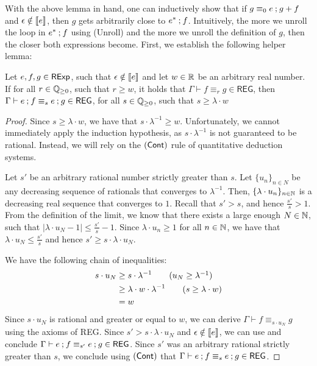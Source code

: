 With the above lemma in hand, one can inductively show that if $g \equiv_0 e \mathbin{;} g + f$ and $\epsilon \notin \left\llbracket{e}\right\rrbracket$, then $g$ gets arbitrarily close to $e^\ast \mathbin{;} f$. Intuitively, the more we unroll the loop in $e^\ast \mathbin{;} f$ using \textsf{(Unroll)} and the more we unroll the definition of $g$, then the closer both expressions become. First, we establish the following helper lemma:
\begin{lemma}\label{c2:lem:real_approximation}
	Let $e,f,g \in \mathsf{RExp}$, such that $\epsilon \notin \left\llbracket{e}\right\rrbracket$ and let $w \in \mathbb{R}$ be an arbitrary real number. If for all $r \in \mathbb{Q}_{\geq 0}$, such that $r \geq w$, it holds that $\Gamma \vdash f \equiv_{r} g \in \mathsf{REG}$, then $\Gamma \vdash e \mathbin{;} f \equiv_{s} e \mathbin{;} g \in \mathsf{REG}$, for all $s \in \mathbb{Q}_{\geq 0}$, such that $s \geq \lambda \cdot w$
\end{lemma}
\begin{proof}
	Since $s \geq \lambda \cdot w$, we have that $s \cdot \lambda^{-1} \geq w$. Unfortunately, we cannot immediately apply the induction hypothesis, as $s \cdot \lambda^{-1}$ is not guaranteed to be rational. Instead, we will rely on the $(\textsf{Cont})$ rule of quantitative deduction systems. 
	
		Let $s'$ be an arbitrary rational number strictly greater than $s$. Let $\{u_n\}_{n \in N}$ be any decreasing sequence of rationals that converges to $\lambda^{-1}$. Then, $\{\lambda \cdot u_n\}_{n \in \mathbb{N}}$ is a decreasing real sequence that converges to $1$. Recall that $s' > s$, and hence $\frac{s'}{s} >1$. From the definition of the limit, we know that there exists a large enough $N \in \mathbb{N}$, such that $|\lambda \cdot u_N - 1 | \leq \frac{s'}{s}-1$. Since $\lambda \cdot u_n \geq 1$ for all $n \in \mathbb{N}$, we have that $\lambda \cdot u_N \leq \frac{s'}{s}$ and hence $s' \geq  s \cdot \lambda \cdot u_N$.
		
			We have the following chain of inequalities:
			\begin{align*}
				s \cdot u_N &\geq s \cdot \lambda^{-1} \tag{$u_N \geq \lambda^{-1}$}\\
				&\geq\lambda \cdot w \cdot \lambda^{-1} \tag{$s \geq \lambda \cdot w$}\\
				&=w
			\end{align*}
		Since $s \cdot u_N$ is rational and greater or equal to $w$, we can derive $\Gamma \vdash f  \equiv_{s \cdot u_N} g$ using the axioms of \textsf{REG}. Since $s' > s \cdot \lambda \cdot u_N$ and $\epsilon \notin \left\llbracket{e}\right\rrbracket$, we can use  and conclude $\Gamma \vdash e \mathbin{;} f \equiv_{s'} e \mathbin{;} g \in \mathsf{REG}$. Since $s'$ was an arbitrary rational strictly greater than $s$, we conclude using $(\textsf{Cont})$ that $ \Gamma\vdash e \mathbin{;} f \equiv_{s} e \mathbin{;} g \in \mathsf{REG}$.
\end{proof}


